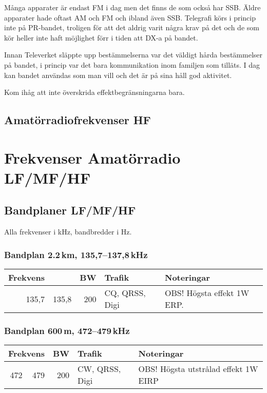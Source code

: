 Många apparater är endast FM i dag men det finns de som också har SSB. Äldre
apparater hade oftast AM och FM och ibland även SSB. Telegrafi körs i princip
inte på PR-bandet, troligen för att det aldrig varit några krav på det och de
som kör heller inte haft möjlighet förr i tiden att DX-a på bandet.

Innan Televerket släppte upp bestämmelserna var det väldigt hårda bestämmelser
på bandet, i princip var det bara kommunikation inom familjen som tilläts. I dag
kan bandet användas som man vill och det är på sina håll god aktivitet.

Kom ihåg att inte överskrida effektbegränsningarna bara.

\subsection{Amatörradiofrekvenser HF}

\section{Frekvenser Amatörradio LF/MF/HF}
\subsection{Bandplaner LF/MF/HF}
Alla frekvenser i kHz, bandbredder i Hz.

\subsubsection{Bandplan 2.2\,km, 135,7--137,8\,kHz}
\begin{tabular}{rrrll}
\textbf{Frekvens} &  & \textbf{BW} & \textbf{Trafik} & \textbf{Noteringar} \\ \hline
135,7 & 135,8 & 200 & CQ, QRSS, Digi & OBS! Högsta effekt 1W ERP. \\ \hline
\end{tabular}

\subsubsection{Bandplan 600\,m, 472--479\,kHz}
\begin{tabular}{rrrll}
\multicolumn{2}{c}{\textbf{Frekvens}} & \textbf{BW} & \textbf{Trafik} & \textbf{Noteringar} \\ \hline
472 & 479 & 200 & CW, QRSS, Digi & OBS! Högsta utstrålad effekt 1W EIRP \\ \hline
\end{tabular}

